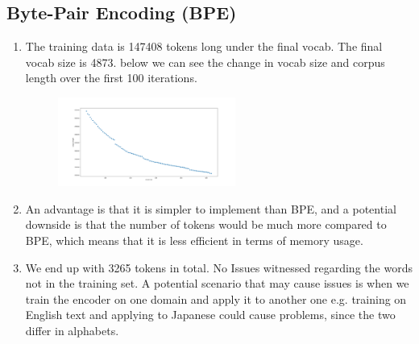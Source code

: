 \documentclass[12pt]{article}
\begin{document}
\begin{center}
\begin{enumerate}[label=(\alph*)]
\begin{enumerate}
	\newpage
	
	\section{Byte-Pair Encoding (BPE)}
\begin{enumerate}[label=(\alph*)]
	\item The training data is 147408 tokens long under the final vocab. The final vocab size is 4873.
	below we can see the change in vocab size and corpus length over the first 100 iterations.
	\begin{figure}[H]
		\centering
		\includegraphics[width=0.55\textwidth]{loop.png}
		
	\end{figure} 
	\item An advantage is that it is simpler to implement than BPE, and a potential downside is that the number of tokens would be much more compared to BPE, which means that it is less efficient in terms of memory usage.
	

	\item We end up with 3265 tokens in total. No Issues witnessed regarding the words not in the training set. A potential scenario that may cause issues is when we train the encoder on one domain and apply it to another one e.g. training on English text and applying to Japanese could cause problems, since the two differ in alphabets.
\end{enumerate}
		
		\end{enumerate}
	\end{enumerate}
\newpage

\end{center}
\end{document}
